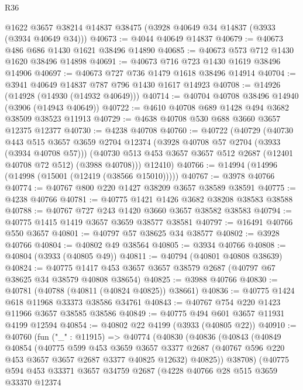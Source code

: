 \begin{lexlean}{R36}
\begin{coremodule}
    @1622
    @3657
    @38214
    @14837
    @38475
    (@3928 @40649 @34 @14837 (@3933 (@3934 @40649 @34)))
@40673 := @4044 @40649 @14837
@40679 := @40673 @486 @686 @1430 @1621 @38496 @14890
@40685 := @40673 @573 @712 @1430 @1620 @38496 @14898
@40691 := @40673 @716 @723 @1430 @1619 @38496 @14906
@40697 := @40673 @727 @736 @1479 @1618 @38496 @14914
@40704 := @3941 @40649 @14837 @787 @796 @1430 @1617 @14923
@40708 := @14926 (@14928 (@14930 (@14932 @40649)))
@40714 := @40704 @40708 @38496 @14940 (@3906 (@14943 @40649))
@40722 := @4610 @40708 @689 @1428 @494 @3682 @38509 @38523 @11913
@40729 := @4638 @40708 @530 @688 @3660 @3657 @12375 @12377
@40730 := @4238 @40708
@40760 := @40722
    (@40729
      (@40730
        @443
        @515
        @3657
        @3659
        @2704
        @12374
        (@3928 @40708 @57 @2704 (@3933 (@3934 @40708 @57)))
        (@40730 @513 @453 @3657 @3657 @512 @2687 (@12401 @40708 @72 @512) (@3988 @40708)))
      @12410)
@40766 := @14994 (@14996 (@14998 (@15001 (@12419 (@38566 @15010)))))
@40767 := @3978 @40766
@40774 := @40767 @800 @220 @1427 @38209 @3657 @38589 @38591
@40775 := @4238 @40766
@40781 := @40775 @1421 @1426 @3682 @38208 @38583 @38588
@40788 := @40767 @727 @243 @1420 @3660 @3657 @38582 @38583
@40794 := @40775 @1415 @1419 @3657 @3659 @38577 @38581
@40797 := @16491 @40766 @550 @3657
@40801 := @40797 @57 @38625 @34 @38577
@40802 := @3928 @40766
@40804 := @40802 @49 @38564
@40805 := @3934 @40766
@40808 := @40804 (@3933 (@40805 @49))
@40811 := @40794 (@40801 @40808 @38639)
@40824 := @40775 @1417 @453 @3657 @3657 @38579 @2687 (@40797 @67 @38625 @34 @38579 @40808 @38654)
@40825 := @3988 @40766
@40830 := @40781 (@40788 (@40811 (@40824 @40825)) @38661)
@40836 := @40775 @1424 @618 @11968 @33373 @38586 @34761
@40843 := @40767 @754 @220 @1423 @11966 @3657 @38585 @38586
@40849 := @40775 @494 @601 @3657 @11931 @4199 @12594
@40854 := @40802 @22 @4199 (@3933 (@40805 @22))
@40910 := @40760
    (fun ("_" : @11915) =>
    @40774
      (@40830
        (@40836
          (@40843
            (@40849
              @40854
              (@40775
                @599
                @453
                @3659
                @3657
                @3377
                @2687
                (@40767 @596 @220 @453 @3657 @3657 @2687 @3377 @40825 @12632)
                @40825))
            @38708)
          (@40775
            @594
            @453
            @33371
            @3657
            @34759
            @2687
            (@4228
              @40766
              @28
              @515
              @3659
              @33370
              @12374

\end{coremodule}
\end{lexlean}
